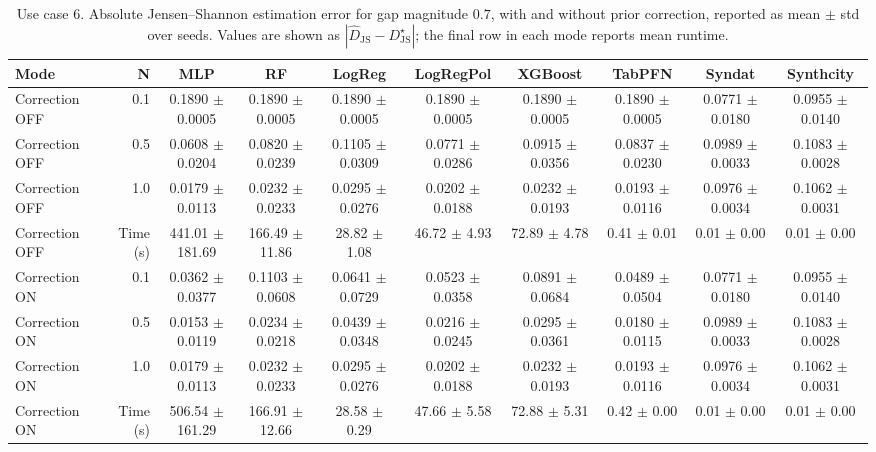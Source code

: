 \begin{table}[ht]
\centering
\scriptsize
\setlength{\tabcolsep}{2.5pt}
\caption{Use case 6. Absolute Jensen--Shannon estimation error for gap magnitude $0.7$, with and without prior correction, reported as mean $\pm$ std over seeds. Values are shown as $|\widehat{D}_{\mathrm{JS}} - D_{\mathrm{JS}}^{\star}|$; the final row in each mode reports mean runtime.}
\label{tab:uc6_gap_0p7_on_off_mean_std_from_seeds}
\begin{tabular}{lrcccccccc}
\toprule
Mode & N & MLP & RF & LogReg & LogRegPol & XGBoost & TabPFN & Syndat & Synthcity \\
\midrule
Correction OFF & 0.1 & 0.1890 $\pm$ 0.0005 & 0.1890 $\pm$ 0.0005 & 0.1890 $\pm$ 0.0005 & 0.1890 $\pm$ 0.0005 & 0.1890 $\pm$ 0.0005 & 0.1890 $\pm$ 0.0005 & 0.0771 $\pm$ 0.0180 & 0.0955 $\pm$ 0.0140 \\
Correction OFF & 0.5 & 0.0608 $\pm$ 0.0204 & 0.0820 $\pm$ 0.0239 & 0.1105 $\pm$ 0.0309 & 0.0771 $\pm$ 0.0286 & 0.0915 $\pm$ 0.0356 & 0.0837 $\pm$ 0.0230 & 0.0989 $\pm$ 0.0033 & 0.1083 $\pm$ 0.0028 \\
Correction OFF & 1.0 & 0.0179 $\pm$ 0.0113 & 0.0232 $\pm$ 0.0233 & 0.0295 $\pm$ 0.0276 & 0.0202 $\pm$ 0.0188 & 0.0232 $\pm$ 0.0193 & 0.0193 $\pm$ 0.0116 & 0.0976 $\pm$ 0.0034 & 0.1062 $\pm$ 0.0031 \\
Correction OFF & Time (s) & 441.01 $\pm$ 181.69 & 166.49 $\pm$ 11.86 & 28.82 $\pm$ 1.08 & 46.72 $\pm$ 4.93 & 72.89 $\pm$ 4.78 & 0.41 $\pm$ 0.01 & 0.01 $\pm$ 0.00 & 0.01 $\pm$ 0.00 \\
Correction ON & 0.1 & 0.0362 $\pm$ 0.0377 & 0.1103 $\pm$ 0.0608 & 0.0641 $\pm$ 0.0729 & 0.0523 $\pm$ 0.0358 & 0.0891 $\pm$ 0.0684 & 0.0489 $\pm$ 0.0504 & 0.0771 $\pm$ 0.0180 & 0.0955 $\pm$ 0.0140 \\
Correction ON & 0.5 & 0.0153 $\pm$ 0.0119 & 0.0234 $\pm$ 0.0218 & 0.0439 $\pm$ 0.0348 & 0.0216 $\pm$ 0.0245 & 0.0295 $\pm$ 0.0361 & 0.0180 $\pm$ 0.0115 & 0.0989 $\pm$ 0.0033 & 0.1083 $\pm$ 0.0028 \\
Correction ON & 1.0 & 0.0179 $\pm$ 0.0113 & 0.0232 $\pm$ 0.0233 & 0.0295 $\pm$ 0.0276 & 0.0202 $\pm$ 0.0188 & 0.0232 $\pm$ 0.0193 & 0.0193 $\pm$ 0.0116 & 0.0976 $\pm$ 0.0034 & 0.1062 $\pm$ 0.0031 \\
Correction ON & Time (s) & 506.54 $\pm$ 161.29 & 166.91 $\pm$ 12.66 & 28.58 $\pm$ 0.29 & 47.66 $\pm$ 5.58 & 72.88 $\pm$ 5.31 & 0.42 $\pm$ 0.00 & 0.01 $\pm$ 0.00 & 0.01 $\pm$ 0.00 \\
\bottomrule
\end{tabular}
\end{table}
